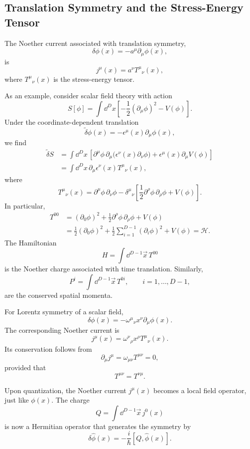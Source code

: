 \subsection{Translation Symmetry and the Stress-Energy Tensor}

The Noether current associated with translation symmetry,
\[
  \delta\phi(x)=-a^\mu\partial_\mu\phi(x),
\]
is
\[
  j^\mu(x)=a^\nu T^\mu{}_\nu(x),
\]
where \(T^\mu{}_\nu(x)\) is the stress-energy tensor.

As an example, consider scalar field theory with action
\[
  S[\phi]
  =
  \int\dd^Dx
  \left[
    -\frac12(\partial_\mu\phi)^2-V(\phi)
  \right].
\]
Under the coordinate-dependent translation
\[
  \widetilde{\delta}\phi(x)=-\epsilon^\mu(x)\partial_\mu\phi(x),
\]
we find
\[
\begin{aligned}
  \widetilde{\delta}S
  &=
  \int\dd^Dx\,
  \left[
    \partial^\mu\phi\,\partial_\mu
      \bigl(\epsilon^\nu(x)\partial_\nu\phi\bigr)
    +
    \epsilon^\mu(x)\partial_\mu V(\phi)
  \right]  \\
  &=
  \int\dd^Dx\,\partial_\mu\epsilon^\nu(x)T^\mu{}_\nu(x),
\end{aligned}
\]
where
\[
  T^\mu{}_\nu(x)
  =
  \partial^\mu\phi\,\partial_\nu\phi
  -
  \delta^\mu{}_\nu
  \left[
    \frac12\partial^\rho\phi\,\partial_\rho\phi+V(\phi)
  \right].
\]
In particular,
\[
\begin{aligned}
  T^{00}
  &=
  (\partial_0\phi)^2
  +\frac12\partial^\rho\phi\,\partial_\rho\phi
  +V(\phi) \\
  &=
  \frac12(\partial_0\phi)^2
  +
  \frac12\sum_{i=1}^{D-1}(\partial_i\phi)^2
  +V(\phi)
  =
  \mathcal H .
\end{aligned}
\]
The Hamiltonian
\[
  H=\int\dd^{D-1}\vec x\,T^{00}
\]
is the Noether charge associated with time translation. Similarly,
\[
  P^i=\int\dd^{D-1}\vec x\,T^{0i},
  \qquad i=1,\ldots,D-1,
\]
are the conserved spatial momenta.

For Lorentz symmetry of a scalar field,
\[
  \delta\phi(x)
  =
  -\omega^\mu{}_\nu x^\nu\partial_\mu\phi(x).
\]
The corresponding Noether current is
\[
  j^\mu(x)
  =
  \omega^\nu{}_\rho x^\rho T^\mu{}_\nu(x).
\]
Its conservation follows from
\[
  \partial_\mu j^\mu
  =
  \omega_{\mu\nu}T^{\mu\nu}
  =
  0,
\]
provided that
\[
  T^{\mu\nu}=T^{\nu\mu}.
\]

Upon quantization, the Noether current \(j^\mu(x)\) becomes a local field
operator, just like \(\phi(x)\). The charge
\[
  Q=\int\dd^{D-1}\vec x\,j^0(x)
\]
is now a Hermitian operator that generates the symmetry by
\[
  \delta\hat\phi(x)
  =
  -\frac{i}{\hbar}[Q,\hat\phi(x)].
\]

